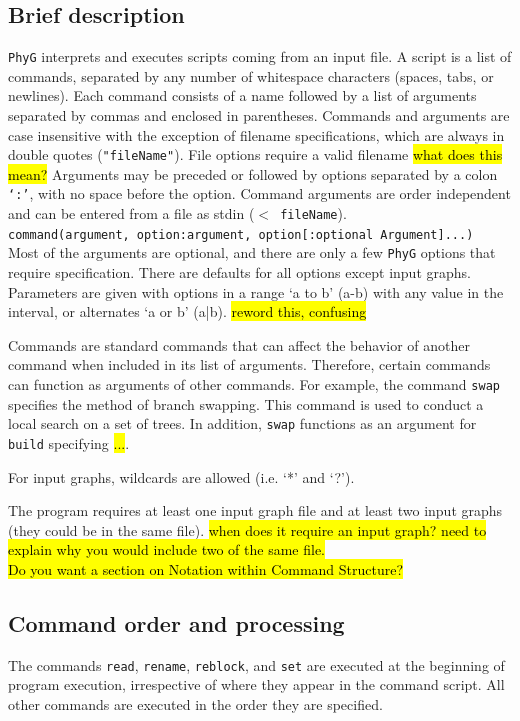 \documentclass[11pt]{book}
\newcommand{\phyg}{\texttt{PhyG} }
\begin{document}
{{	\subsection{Brief description}
		\phyg interprets and executes scripts coming from an input file. A script is a list of 
		commands, separated by any number of whitespace characters (spaces, tabs, or 
		newlines). Each command consists of a name followed by a list of arguments 
		separated by commas and enclosed in parentheses. Commands and arguments 
		are case insensitive with the exception of filename specifications, which are always 
		in double quotes (\texttt{"fileName"}). File options require a valid filename \hl{what 
		does this mean?} Arguments may be preceded or followed by 
		options separated by a colon \texttt{`:'}, with no space before the option. Command 
		arguments are order independent and can be entered from a file as stdin 
		(\texttt{$<$ fileName}).\\
		
		\indent \texttt{command(argument, option:argument, option[:optional Argument]...)}\\
		
		
		\noindent Most of the arguments are optional, and there are only a few \phyg options
		 that require specification. 	There are defaults for all options except input graphs. 
		 Parameters are given with options in a range `a to b' (a-b) with any value in the interval, 
		 or alternates `a or b' (a|b). 
		\hl{reword this, confusing}
		
		Commands are standard commands that can affect the behavior of another command 
		when included in its list of arguments. Therefore, certain commands can function as 
		arguments of other commands. For example, the command \texttt{swap} specifies 
		the method of branch swapping. This command is used to conduct a local search on 
		a set of trees. In addition, \texttt{swap} functions as an argument for \texttt{build}
		specifying \hl{...}.
		
		For input graphs, wildcards are allowed (i.e. `*' and `?').
	
		The program requires at least one input graph file and at least two input graphs (they 
		could be in the same file). 
		\hl{when does it require an input graph? need to explain why you would include two of 
		the same file.}\\
	
	\hl{Do you want a section on Notation within Command Structure?}
	
	\subsection{Command order and processing}
		The commands \texttt{read}, \texttt{rename}, \texttt{reblock}, and \texttt{set} are executed at
		the beginning of program execution, irrespective of where they appear in the command script.  
		All other commands are executed in the order they are specified.

}}
\end{document}
